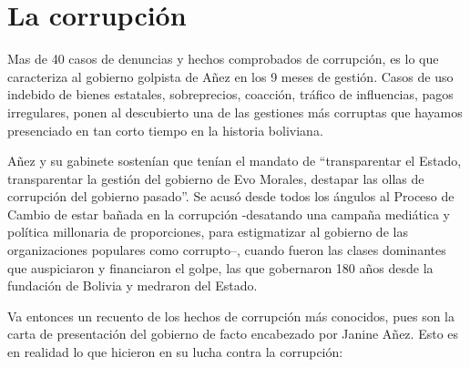 \documentclass[a4paper, nobind]{templates/ociamthesis}
\begin{document}
\hypertarget{la-corrupciuxf3n}{%
\chapter{La corrupción}\label{la-corrupciuxf3n}}

Mas de 40 casos de denuncias y hechos comprobados de corrupción, es lo que caracteriza al gobierno golpista de Añez en los 9 meses de gestión. Casos de uso indebido de bienes estatales, sobreprecios, coacción, tráfico de influencias, pagos irregulares, ponen al descubierto una de las gestiones más corruptas que hayamos presenciado en tan corto tiempo en la historia boliviana.

Añez y su gabinete sostenían que tenían el mandato de ``transparentar el Estado, transparentar la gestión del gobierno de Evo Morales, destapar las ollas de corrupción del gobierno pasado''. Se acusó desde todos los ángulos al Proceso de Cambio de estar bañada en la corrupción -desatando una campaña mediática y política millonaria de proporciones, para estigmatizar al gobierno de las organizaciones populares como corrupto--, cuando fueron las clases dominantes que auspiciaron y financiaron el golpe, las que gobernaron 180 años desde la fundación de Bolivia y medraron del Estado.

Va entonces un recuento de los hechos de corrupción más conocidos, pues son la carta de presentación del gobierno de facto encabezado por Janine Añez. Esto es en realidad lo que hicieron en su lucha contra la corrupción:
\end{document}
